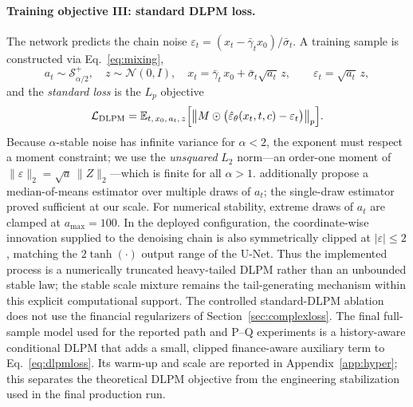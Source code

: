 ﻿\documentclass[12pt,letterpaper]{article}
\begin{document}
\paragraph{Training objective III: standard DLPM loss.}
The network predicts the chain noise
$\varepsilon_t = (x_t - \bar\gamma_t x_0)/\bar\sigma_t$. A training sample is
constructed via Eq.~\eqref{eq:mixing},
\begin{equation}
a_t \sim \mathcal{S}_{\alpha/2}^{+}, \quad z \sim \mathcal{N}(0, I), \quad
x_t = \bar\gamma_t\, x_0 + \bar\sigma_t \sqrt{a_t}\, z,
\qquad \varepsilon_t = \sqrt{a_t}\, z,
\end{equation}
and the \emph{standard loss} is the $L_p$ objective
\begin{equation}
\mathcal{L}_{\mathrm{DLPM}}
= \mathbb{E}_{t,\,x_0,\,a_t,\,z}
\Bigl[\bigl\| M \odot \bigl(\hat\varepsilon_\theta(x_t, t, c) -
\varepsilon_t\bigr)\bigr\|_p \Bigr].
\label{eq:dlpmloss}
\end{equation}
Because $\alpha$-stable noise has infinite variance for $\alpha < 2$, the
exponent must respect a moment constraint; we use the \emph{unsquared} $L_2$
norm---an order-one moment of
$\|\varepsilon\|_2 = \sqrt{a}\,\|Z\|_2$---which is finite for all
$\alpha > 1$. \citet{shariatian2024dlpm} additionally propose a
median-of-means estimator over multiple draws of $a_t$; the single-draw
estimator proved sufficient at our scale. For numerical stability, extreme
draws of $a_t$ are clamped at $a_{\max} = 100$. In the deployed configuration,
the coordinate-wise innovation supplied to the denoising chain is also
symmetrically clipped at $\lvert\varepsilon\rvert\leq 2$, matching the
$2\tanh(\cdot)$ output range of the U-Net. Thus the implemented process is a
numerically truncated heavy-tailed DLPM rather than an unbounded stable law;
the stable scale mixture remains the tail-generating mechanism within this
explicit computational support. The controlled standard-DLPM ablation does not use
the financial regularizers of Section~\ref{sec:complexloss}. The final
full-sample model used for the reported path and P--Q experiments is a
history-aware conditional DLPM that adds a small, clipped finance-aware
auxiliary term to Eq.~\eqref{eq:dlpmloss}. Its warm-up and scale are reported
in Appendix~\ref{app:hyper}; this separates the theoretical DLPM objective
from the engineering stabilization used in the final production run.
\end{document}
